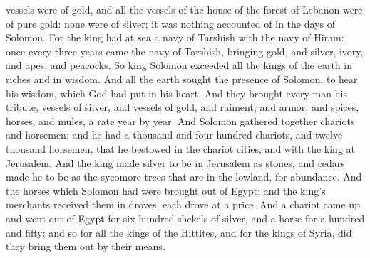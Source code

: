 vessels were of gold, and all the vessels of the house of the forest of Lebanon were of pure gold: none were of silver; it was nothing accounted of in the days of Solomon. For the king had at sea a navy of Tarshish with the navy of Hiram: once every three years came the navy of Tarshish, bringing gold, and silver, ivory, and apes, and peacocks.  So king Solomon exceeded all the kings of the earth in riches and in wisdom. And all the earth sought the presence of Solomon, to hear his wisdom, which God had put in his heart. And they brought every man his tribute, vessels of silver, and vessels of gold, and raiment, and armor, and spices, horses, and mules, a rate year by year.  And Solomon gathered together chariots and horsemen: and he had a thousand and four hundred chariots, and twelve thousand horsemen, that he bestowed in the chariot cities, and with the king at Jerusalem. And the king made silver to be in Jerusalem as stones, and cedars made he to be as the sycomore-trees that are in the lowland, for abundance. And the horses which Solomon had were brought out of Egypt; and the king’s merchants received them in droves, each drove at a price. And a chariot came up and went out of Egypt for six hundred shekels of silver, and a horse for a hundred and fifty; and so for all the kings of the Hittites, and for the kings of Syria, did they bring them out by their means. 

